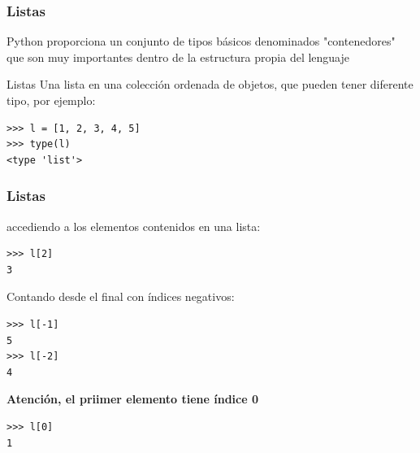 \documentclass[10pt,colorlinks]{beamer}
\begin{document}
\begin{frame}[fragile]\frametitle{Listas}
Python proporciona un conjunto de tipos básicos denominados "contenedores" que son muy importantes dentro de la estructura propia del lenguaje
\begin{block}{Listas}
Una lista en una colección ordenada de objetos, que pueden tener diferente tipo, por ejemplo:
\begin{verbatim}
>>> l = [1, 2, 3, 4, 5]
>>> type(l)
<type 'list'>
\end{verbatim}

\end{block}
\end{frame}

\begin{frame}[fragile]\frametitle{Listas}
\begin{block}{accediendo a los elementos contenidos en una lista:}
\tiny
\begin{verbatim}
>>> l[2]
3
\end{verbatim}

\end{block}
\begin{block}{Contando desde el final con índices negativos:}
\tiny
\begin{verbatim}
>>> l[-1]
5
>>> l[-2]
4
\end{verbatim}

\end{block}
\begin{block}{{\color{green}\textbf{Atención, el priimer elemento tiene índice 0} }}
\tiny
\begin{verbatim}
>>> l[0]
1
\end{verbatim}

\end{block}
\end{frame}
\end{document}
